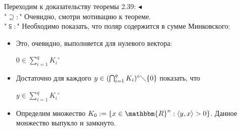 Переходим к доказательству теоремы 2.39:
$\blacktriangleleft$\\
"$\supseteq :$"  Очевидно, смотри мотивацию к теореме.
\\
"$\subseteqq :$"  Необходимо показать, что поляр содержится в сумме Минковского:
\begin{itemize}
    \item Это, очевидно, выполняется для нулевого вектора:
\begin{center}
    $0\in\sum_{i=1}^{q}{K_i}^{\circ}$
\end{center}

\item Достаточно для каждого $y\in(\bigcap_{i=1}^{q}{K_i})^{\circ} \diagdown \{0\}$ показать, что \begin{center}
    $y\in\sum_{i=1}^{q}{K_i}^{\circ}$
\end{center}

\item Определим множество $K_0:=\{x\in \mathbbm{R}^{n} :\langle y,x\rangle>0\}$. Данное монжество выпукло и замкнуто.


\end{itemize}
